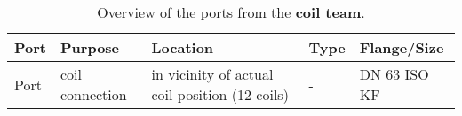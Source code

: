 \begin{table}[H]
    \centering
    \caption{Overview of the ports from the \textbf{coil team}.}
    \begin{tabular}{>{\raggedright\arraybackslash}p{2cm} >{\raggedright\arraybackslash}p{3cm} >{\raggedright\arraybackslash}p{3.5cm} >{\raggedright\arraybackslash}p{3.5cm} >{\raggedright\arraybackslash}p{2cm}}
        \toprule
        \textbf{Port} & \textbf{Purpose} & \textbf{Location}                              & \textbf{Type}       & \textbf{Flange/Size} \\
        \midrule
        Port         &    coil connection         & in vicinity of actual coil position (12 coils) &  - &  DN 63 ISO KF  \\
        \bottomrule
    \end{tabular}
\end{table}
